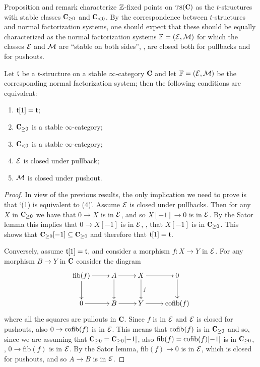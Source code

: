 \documentclass[a4paper,12pt]{amsart}
\begin{document}
Proposition  and remark  characterize $\mathbb{Z} $-fixed points on $\ts(\C)$ as the $t$-structures with stable classes $\C_{\geq 0}$ and $\C_{<0}$. By the correspondence between $t$-structures and normal factorization systems, one should expect that these should be equally characterized as the normal factorization systems  $\mathbb{F}=(\mathcal{E},\mathcal{M})$ for which the classes $\mathcal{E}$ and $\mathcal{M}$ are ``stable on both sides'', \ie, are closed both for pullbacks and for pushouts.
\begin{theorem}\label{enactedstableare}
Let $\mathfrak{t}$ be a $t$-structure on a stable $\infty$-category $\C$ and let $\mathbb{F}=(\mathcal{E},\mathcal{M})$ be the corresponding normal factorization system; then the following conditions are equivalent:
\begin{enumerate}
\item $\mathfrak{t}[1]=\mathfrak{t}$;
\item $\C_{\geq 0}$ is a stable $\infty$-category;
\item $\C_{< 0}$ is a stable $\infty$-category;
\item $\mathcal{E}$ is closed under pullback;
\item $\mathcal{M}$ is closed under pushout.
\end{enumerate}
\end{theorem}
\begin{proof}
In view of the previous results, the only implication we need to prove is that `(1) is equivalent to (4)'. Assume $\mathcal{E}$ is closed under pullbacks. Then for any $X$ in $\C_{\geq 0}$ we have that $0\to X$ is in $\mathcal{E}$, and so $X[-1]\to 0$ is in $\mathcal{E}$. By the Sator lemma this implies that $0\to X[-1]$ is in $\mathcal{E}$, \ie, that $X[-1]$ is in $\C_{\geq 0}$. This shows that $\C_{\geq 0}[-1]\subseteq \C_{\geq 0}$ and therefore that $\mathfrak{t}[1]= \mathfrak{t}$. 

Conversely, assume $\mathfrak{t}[1]=\mathfrak{t}$,
and consider a morphism $f\colon X\to Y$ in $\mathcal{E}$. For any morphism $B\to Y$ in $\C$
consider the diagram
\[
\xymatrix{
\mathrm{fib}(f)\ar[r]\ar[d] & A\ar[r]\ar[d] & X\ar[r]\ar[d]^{f} & 0\ar[d]\\
0 \ar[r] & B\ar[r]  & Y\ar[r]  & \cofib(f)
}
\]
where all the squares are pullouts in $\C$. Since $f$ is in $\mathcal{E}$ and $\mathcal{E}$ is closed for pushouts, also $0\to \operatorname{cofib}(f)$ is in $\mathcal{E}$. This means that $\operatorname{cofib}(f)$ is in $\C_{\geq 0}$ and so, since we are assuming that $\C_{\geq 0}=\C_{\geq 0}[-1]$, also $\mathrm{fib}(f)=\operatorname{cofib}(f)[-1]$ is in $\C_{\geq 0}$, \ie,  $0\to \mathrm{fib}(f)$ is in $\mathcal{E}$. By the Sator lemma, $\mathrm{fib}(f)\to 0$ is in $\mathcal{E}$, which is closed for pushouts, and so $A\to B$ is in $\mathcal{E}$.
\end{proof}
\end{document}
